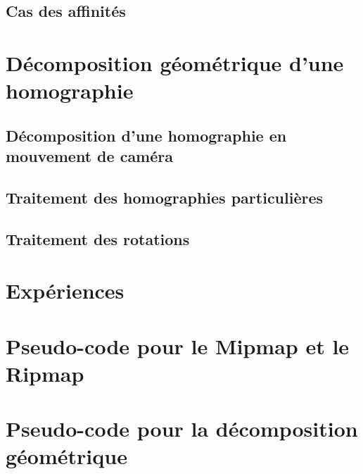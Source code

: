 \documentclass[a4paper,11pt]{article}
\begin{document}
		\subsection{Cas des affinités}
	\section{Décomposition géométrique d'une homographie}
		\label{decomp_geo_hom}
		\subsection{Décomposition d'une homographie en mouvement de caméra}
		\subsection{Traitement des homographies particulières}
			\label{HomoboxRipmap}
		\subsection{Traitement des rotations}
			\label{YaroSzeli}
	\section{Expériences}
		\label{experiences}
		
		
		

	\appendix
	\label{pseudo_code}
	\section{Pseudo-code pour le Mipmap et le Ripmap}
	\section{Pseudo-code pour la décomposition géométrique}
		
	\nocite{*}
	
	
\end{document}
